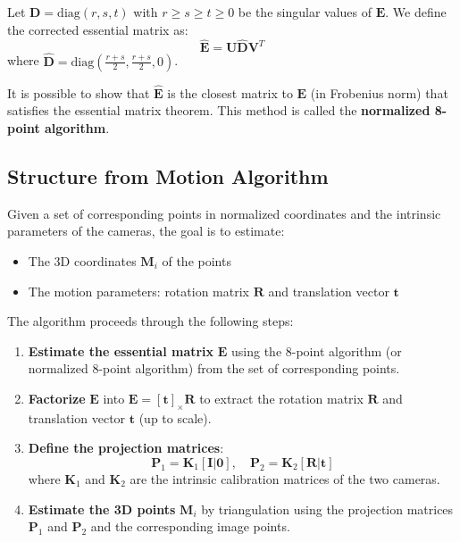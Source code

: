 \documentclass[11pt,a4paper]{article}
\theoremstyle{definition}
\theoremstyle{plain}
\theoremstyle{remark}
\begin{document}
Let $\mathbf{D} = \text{diag}(r, s, t)$ with $r \geq s \geq t \geq 0$ be the singular values of $\mathbf{E}$.
We define the corrected essential matrix as:
\begin{equation} \label{eq:corrected_E}
    \hat{\mathbf{E}} = \mathbf{U} \hat{\mathbf{D}} \mathbf{V}^T
\end{equation}
where $\hat{\mathbf{D}} = \text{diag}\left(\frac{r+s}{2}, \frac{r+s}{2}, 0\right)$.

It is possible to show that $\hat{\mathbf{E}}$ is the closest matrix to $\mathbf{E}$ (in Frobenius norm) that satisfies the essential matrix theorem.
This method is called the \textbf{normalized 8-point algorithm}.

\subsection{Structure from Motion Algorithm}

\begin{tcolorbox}[colback=blue!5!white,colframe=blue!75!black,title=Structure from Motion Algorithm]
Given a set of corresponding points in normalized coordinates and the intrinsic parameters of the cameras, the goal is to estimate:
\begin{itemize}
    \item The 3D coordinates $\mathbf{M}_i$ of the points
    \item The motion parameters: rotation matrix $\mathbf{R}$ and translation vector $\mathbf{t}$
\end{itemize}
\end{tcolorbox}

The algorithm proceeds through the following steps:

\begin{enumerate}
    \item \textbf{Estimate the essential matrix} $\mathbf{E}$ using the 8-point algorithm (or normalized 8-point algorithm) from the set of corresponding points.
    
    \item \textbf{Factorize} $\mathbf{E}$ into $\mathbf{E} = [\mathbf{t}]_{\times} \mathbf{R}$ to extract the rotation matrix $\mathbf{R}$ and translation vector $\mathbf{t}$ (up to scale).
    
    \item \textbf{Define the projection matrices}:
    \begin{equation} \nonumber
        \mathbf{P}_1 = \mathbf{K}_1 [\mathbf{I} | \mathbf{0}], \quad \mathbf{P}_2 = \mathbf{K}_2 [\mathbf{R} | \mathbf{t}]
    \end{equation}
    where $\mathbf{K}_1$ and $\mathbf{K}_2$ are the intrinsic calibration matrices of the two cameras.
    
    \item \textbf{Estimate the 3D points} $\mathbf{M}_i$ by triangulation using the projection matrices $\mathbf{P}_1$ and $\mathbf{P}_2$ and the corresponding image points.
\end{enumerate}
\end{document}
